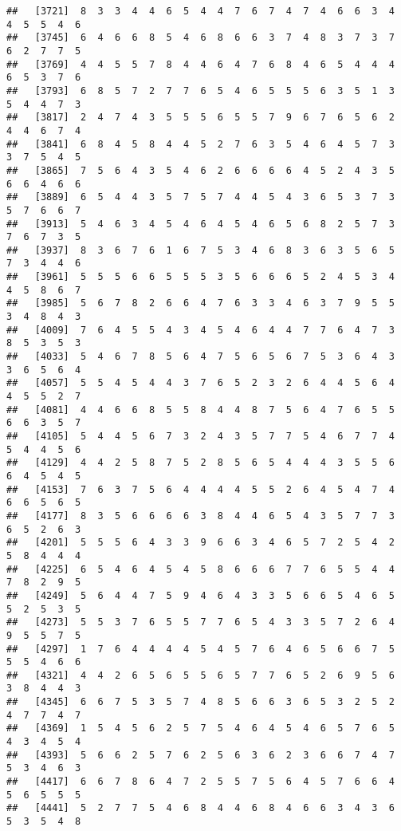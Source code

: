 \documentclass[
]{book}
\begin{document}
\begin{verbatim}
##   [3721]  8  3  3  4  4  6  5  4  4  7  6  7  4  7  4  6  6  3  4  4  5  5  4  6
##   [3745]  6  4  6  6  8  5  4  6  8  6  6  3  7  4  8  3  7  3  7  6  2  7  7  5
##   [3769]  4  4  5  5  7  8  4  4  6  4  7  6  8  4  6  5  4  4  4  6  5  3  7  6
##   [3793]  6  8  5  7  2  7  7  6  5  4  6  5  5  5  6  3  5  1  3  5  4  4  7  3
##   [3817]  2  4  7  4  3  5  5  5  6  5  5  7  9  6  7  6  5  6  2  4  4  6  7  4
##   [3841]  6  8  4  5  8  4  4  5  2  7  6  3  5  4  6  4  5  7  3  3  7  5  4  5
##   [3865]  7  5  6  4  3  5  4  6  2  6  6  6  6  4  5  2  4  3  5  6  6  4  6  6
##   [3889]  6  5  4  4  3  5  7  5  7  4  4  5  4  3  6  5  3  7  3  5  7  6  6  7
##   [3913]  5  4  6  3  4  5  4  6  4  5  4  6  5  6  8  2  5  7  3  7  6  7  3  5
##   [3937]  8  3  6  7  6  1  6  7  5  3  4  6  8  3  6  3  5  6  5  7  3  4  4  6
##   [3961]  5  5  5  6  6  5  5  5  3  5  6  6  6  5  2  4  5  3  4  4  5  8  6  7
##   [3985]  5  6  7  8  2  6  6  4  7  6  3  3  4  6  3  7  9  5  5  3  4  8  4  3
##   [4009]  7  6  4  5  5  4  3  4  5  4  6  4  4  7  7  6  4  7  3  8  5  3  5  3
##   [4033]  5  4  6  7  8  5  6  4  7  5  6  5  6  7  5  3  6  4  3  3  6  5  6  4
##   [4057]  5  5  4  5  4  4  3  7  6  5  2  3  2  6  4  4  5  6  4  4  5  5  2  7
##   [4081]  4  4  6  6  8  5  5  8  4  4  8  7  5  6  4  7  6  5  5  6  6  3  5  7
##   [4105]  5  4  4  5  6  7  3  2  4  3  5  7  7  5  4  6  7  7  4  5  4  4  5  6
##   [4129]  4  4  2  5  8  7  5  2  8  5  6  5  4  4  4  3  5  5  6  6  4  5  4  5
##   [4153]  7  6  3  7  5  6  4  4  4  4  5  5  2  6  4  5  4  7  4  6  6  5  6  5
##   [4177]  8  3  5  6  6  6  6  3  8  4  4  6  5  4  3  5  7  7  3  6  5  2  6  3
##   [4201]  5  5  5  6  4  3  3  9  6  6  3  4  6  5  7  2  5  4  2  5  8  4  4  4
##   [4225]  6  5  4  6  4  5  4  5  8  6  6  6  7  7  6  5  5  4  4  7  8  2  9  5
##   [4249]  5  6  4  4  7  5  9  4  6  4  3  3  5  6  6  5  4  6  5  5  2  5  3  5
##   [4273]  5  5  3  7  6  5  5  7  7  6  5  4  3  3  5  7  2  6  4  9  5  5  7  5
##   [4297]  1  7  6  4  4  4  4  5  4  5  7  6  4  6  5  6  6  7  5  5  5  4  6  6
##   [4321]  4  4  2  6  5  6  5  5  6  5  7  7  6  5  2  6  9  5  6  3  8  4  4  3
##   [4345]  6  6  7  5  3  5  7  4  8  5  6  6  3  6  5  3  2  5  2  4  7  7  4  7
##   [4369]  1  5  4  5  6  2  5  7  5  4  6  4  5  4  6  5  7  6  5  4  3  4  5  4
##   [4393]  5  6  6  2  5  7  6  2  5  6  3  6  2  3  6  6  7  4  7  5  3  4  6  3
##   [4417]  6  6  7  8  6  4  7  2  5  5  7  5  6  4  5  7  6  6  4  5  6  5  5  5
##   [4441]  5  2  7  7  5  4  6  8  4  4  6  8  4  6  6  3  4  3  6  5  3  5  4  8

\end{verbatim}
\end{document}
